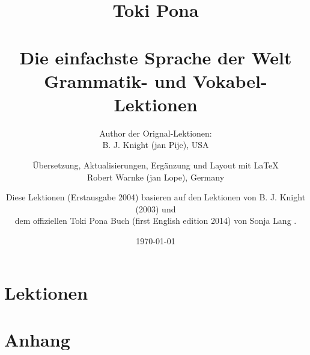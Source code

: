 \documentclass[a4paper, 10pt]{book}
\begin{document}
\setlength{\topmargin}{-19mm}
\setlength{\headheight}{5mm}
\setlength{\headsep}{10mm}
\setlength{\textheight}{245mm}
\setlength{\textwidth}{155mm}
\setlength{\oddsidemargin}{5mm}
\setlength{\evensidemargin}{-1mm}
\setlength{\footskip}{20mm}
\setlength{\parindent}{0mm}
\setlength{\parskip}{2.0ex plus 1.0ex minus 0.5ex}
\batchmode
\title{
Toki Pona \\ \\ 
Die einfachste Sprache der Welt \\
Grammatik- und Vokabel-Lektionen \\
}
\author{
Author der Orignal-Lektionen: \\ B. J. Knight (jan Pije), USA \cite{www:Pije:01} \\  
\and
Übersetzung, Aktualisierungen, Ergänzung und Layout mit \LaTeX \\ Robert Warnke (jan Lope), Germany \cite{www:rowa:01} \\ 
\and
Diese Lektionen (Erstausgabe 2004) basieren auf den Lektionen von B. J. Knight (2003) und \\  
dem offiziellen Toki Pona Buch (first English edition 2014) von Sonja Lang \cite{www:tokipona.org}. 
}

%
\date
\today
\maketitle
\tableofcontents
%
\chapter{Lektionen}






















%
\appendix
\chapter{Anhang}
%
%







%


\printindex
\end{document}
